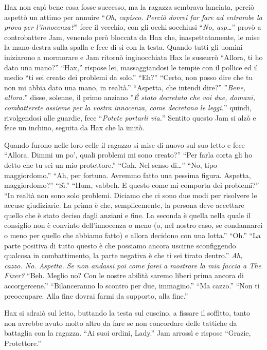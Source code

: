     Hax non capì bene cosa fosse successo, ma la ragazza sembrava lanciata,
    perciò aspettò un attimo per annuire ``\emph{Oh, capisco. Perciò dovrei
    far fare ad entrambe la prova per l'innocenza?}'' fece il vecchio, con
    gli occhi socchiusi ``\emph{No, asp\dots{}}'' provò a controbattere
    Jam, venendo però bloccata da Hax che, inaspettatamente, le mise la
    mano destra sulla spalla e fece di sì con la testa. Quando tutti gli
    uomini iniziarono a mormorare e Jam ritornò inginocchiata Hax le
    sussurrò ``Allora, ti ho dato una mano?'' ``Hax,'' rispose lei,
    massaggiandosi le tempie con il pollice ed il medio ``ti sei creato dei
    problemi da solo.'' ``Eh?'' ``Certo, non posso dire che tu non mi
    abbia dato una mano, in realtà.'' ``Aspetta, che intendi dire?''
    ''\emph{Bene, allora.}'' disse, solenne, il primo anziano ''\emph{\'E
    stato decretato che voi due, domani, combatterete assieme per la vostra
    innocenza, come decretano le leggi.}'' quindi, rivolgendosi alle
    guardie, fece ``\emph{Potete portarli via.}'' Sentito questo Jam si
    alzò e fece un inchino, seguita da Hax che la imitò.

    Quando furono nelle loro celle il ragazzo si mise di nuovo sul suo
    letto e fece ``Allora. Dimmi un po', quali problemi mi sono creato?''
    ``Per farla corta gli ho detto che tu sei un mio protettore.'' ``Gah.
    Nel senso di\dots{}'' ``No, tipo maggiordomo.'' ``Ah, per fortuna.
    Avremmo fatto una pessima figura. Aspetta, maggiordomo?'' ``Sì.''
    ``Hum, vabbeh. E questo come mi comporta dei problemi?'' ``In realtà
    non sono solo problemi. Diciamo che ci sono due modi per risolvere le
    accuse giudiziarie. La prima è che, semplicemente, la persona deve
    accettare quello che è stato deciso dagli anziani e fine. La seconda è
    quella nella quale il consiglio non è convinto dell'innocenza o meno
    (o, nel nostro caso, se condannarci o meno per quello che abbiamo
    fatto) e allora decidono con una lotta.'' ``Oh.'' ``La parte positiva
    di tutto questo è che possiamo ancora uscirne sconfiggendo qualcosa in
    combattimento, la
    parte negativa è che ti sei tirato dentro.'' \emph{Ah, cazzo. No.
    Aspetta. Se non andassi poi come farei a mostrare la mia faccia a The
    Fixer?} ``Beh. Meglio no? Con le nostre abilità saremo liberi prima
    ancora di accorgercene.'' ``Bilanceranno lo scontro per due,
    immagino.'' ``Ma cazzo.'' ``Non ti preoccupare. Alla fine dovrai farmi
    da supporto, alla fine.''
    
    Hax si sdraiò sul letto, buttando la testa sul cuscino, a fissare il soffitto, tanto non avrebbe avuto
    molto altro da fare se non concordare delle tattiche da battaglia con
    la ragazza. ``Ai suoi ordini, Lady.'' Jam arrossì e rispose ``Grazie,
    Protettore.''


